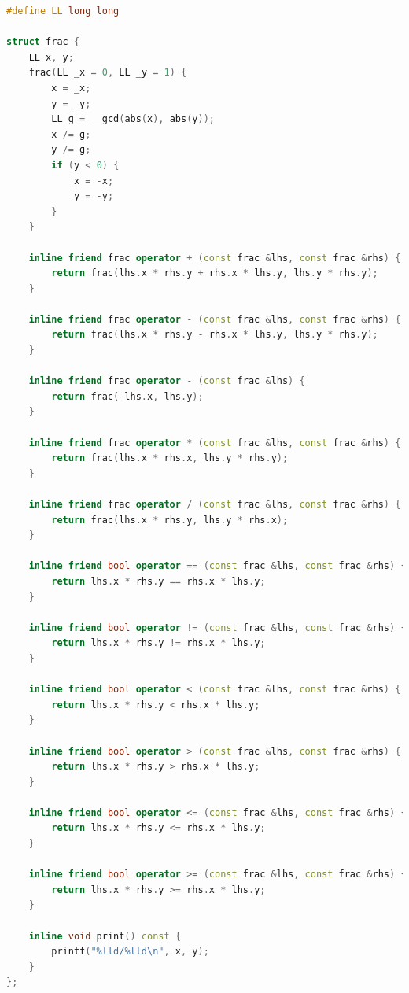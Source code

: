 \documentclass{article}
\begin{document}
\begin{lstlisting}[language=C++]
#define LL long long

struct frac {
	LL x, y;
	frac(LL _x = 0, LL _y = 1) {
		x = _x;
		y = _y;
		LL g = __gcd(abs(x), abs(y));
		x /= g;
		y /= g;
		if (y < 0) {
			x = -x;
			y = -y;
		}
	}

	inline friend frac operator + (const frac &lhs, const frac &rhs) {
		return frac(lhs.x * rhs.y + rhs.x * lhs.y, lhs.y * rhs.y);
	}

	inline friend frac operator - (const frac &lhs, const frac &rhs) {
		return frac(lhs.x * rhs.y - rhs.x * lhs.y, lhs.y * rhs.y);
	}

	inline friend frac operator - (const frac &lhs) {
		return frac(-lhs.x, lhs.y);
	}

	inline friend frac operator * (const frac &lhs, const frac &rhs) {
		return frac(lhs.x * rhs.x, lhs.y * rhs.y);
	}

	inline friend frac operator / (const frac &lhs, const frac &rhs) {
		return frac(lhs.x * rhs.y, lhs.y * rhs.x);
	}

	inline friend bool operator == (const frac &lhs, const frac &rhs) {
		return lhs.x * rhs.y == rhs.x * lhs.y;
	}

	inline friend bool operator != (const frac &lhs, const frac &rhs) {
		return lhs.x * rhs.y != rhs.x * lhs.y;
	}

	inline friend bool operator < (const frac &lhs, const frac &rhs) {
		return lhs.x * rhs.y < rhs.x * lhs.y;
	}

	inline friend bool operator > (const frac &lhs, const frac &rhs) {
		return lhs.x * rhs.y > rhs.x * lhs.y;
	}

	inline friend bool operator <= (const frac &lhs, const frac &rhs) {
		return lhs.x * rhs.y <= rhs.x * lhs.y;
	}

	inline friend bool operator >= (const frac &lhs, const frac &rhs) {
		return lhs.x * rhs.y >= rhs.x * lhs.y;
	}

	inline void print() const {
		printf("%lld/%lld\n", x, y);
	}
};
\end{lstlisting}
\end{document}

